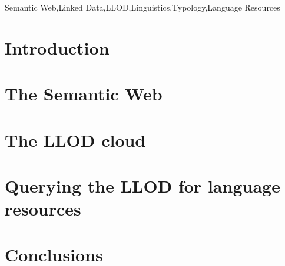 \documentclass{iosart2c}
\begin{document}
\begin{frontmatter}
\begin{abstract}

\end{abstract}

\begin{keyword}
Semantic Web\sep Linked Data\sep LLOD\sep Linguistics\sep Typology\sep Language Resources
\end{keyword}
\end{frontmatter}

\section{Introduction}


\section{The Semantic Web}


\section{The LLOD cloud}


\section{Querying the LLOD for language resources}


\section{Conclusions}



\end{document}
